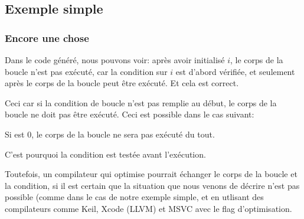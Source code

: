 \subsection{Exemple simple}





\subsubsection{Encore une chose}

Dans le code généré, nous pouvons voir:
après avoir initialisé $i$, le corps de la boucle n'est pas exécuté, car la condition
sur $i$ est d'abord vérifiée, et seulement après le corps de la boucle peut être
exécuté.
Et cela est correct.

Ceci car si la condition de boucle n'est pas remplie au début, le corps de la boucle
ne doit pas être exécuté.
Ceci est possible dans le cas suivant:



Si  est 0, le corps de la boucle ne sera
pas exécuté du tout.

C'est pourquoi la condition est testée avant l'exécution.

Toutefois, un compilateur qui optimise pourrait échanger le corps de la boucle et
la condition, si il est certain que la situation que nous venons de décrire n'est
pas possible (comme dans le cas de notre exemple simple, et en utlisant des compilateurs
comme Keil, Xcode (LLVM) et MSVC avec le flag d'optimisation.
